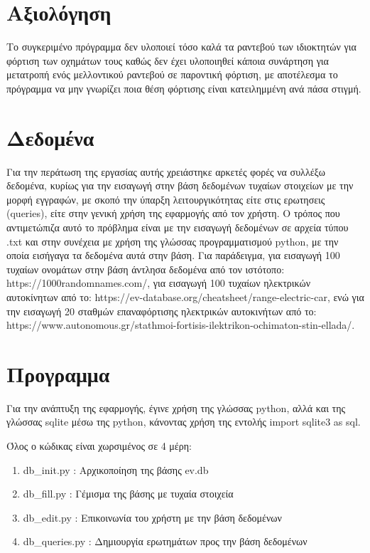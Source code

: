 \documentclass[manuscript,screen,review]{acmart}
\newcommand{\en}[1]{\foreignlanguage{english}{#1}}
\begin{document}
\newpage

\section {Αξιολόγηση}


Το συγκεριμένο πρόγραμμα δεν υλοποιεί τόσο καλά τα ραντεβού των ιδιοκτητών για φόρτιση των οχημάτων 
τους καθώς δεν έχει υλοποιηθεί κάποια συνάρτηση για μετατροπή ενός μελλοντικού ραντεβού σε παροντική 
φόρτιση, με αποτέλεσμα το πρόγραμμα να μην γνωρίζει ποια θέση φόρτισης είναι κατειλημμένη ανά πάσα στιγμή.

\section {Δεδομένα}


Για την περάτωση της εργασίας αυτής χρειάστηκε αρκετές φορές να συλλέξω δεδομένα, κυρίως για την 
εισαγωγή στην βάση δεδομένων τυχαίων στοιχείων με την μορφή εγγραφών, με σκοπό την ύπαρξη λειτουργικότητας
είτε στις ερωτησεις (\en{queries}), είτε στην γενική χρήση της εφαρμογής από τον χρήστη. Ο τρόπος που
αντιμετώπιζα αυτό το πρόβλημα είναι με την εισαγωγή δεδομένων σε αρχεία τύπου \en{.txt} και στην συνέχεια
με χρήση της γλώσσας προγραμματισμού \en{python}, με την οποία εισήγαγα τα δεδομένα αυτά στην βάση.
Για παράδειγμα, για εισαγωγή 100 τυχαίων ονομάτων στην βάση άντλησα δεδομένα από τον ιστότοπο: 
\en{https://1000randomnames.com/}, για εισαγωγή 100 τυχαίων ηλεκτρικών αυτοκίνητων από το:
\en{https://ev-database.org/cheatsheet/range-electric-car}, ενώ για την εισαγωγή 20 σταθμών 
επαναφόρτισης ηλεκτρικών αυτοκινήτων από το: 
\en{https://www.autonomous.gr/stathmoi-fortisis-ilektrikon-ochimaton-stin-ellada/}.


\section{Προγραμμα}


Για την ανάπτυξη της εφαρμογής, έγινε χρήση της γλώσσας \en{python}, αλλά και της γλώσσας \en{sqlite} μέσω
της \en{python}, κάνοντας χρήση της εντολής \en{import sqlite3 as sql}.

Όλος ο κώδικας είναι χωρσιμένος σε 4 μέρη:

\begin{enumerate}
	\item \en{db\_init.py} : Αρχικοποίηση της βάσης \en{ev.db}
	\item \en{db\_fill.py} : Γέμισμα της βάσης με τυχαία στοιχεία
	\item \en{db\_edit.py} : Επικοινωνία του χρήστη με την βάση δεδομένων
	\item \en{db\_queries.py} : Δημιουργία ερωτημάτων προς την βάση δεδομένων
\end{enumerate}
\end{document}
